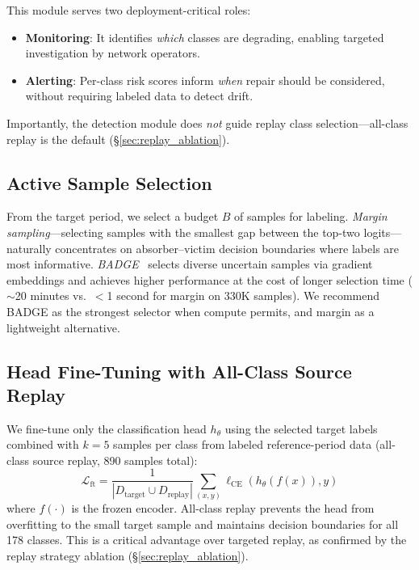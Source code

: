 \documentclass[journal]{IEEEtran}
\begin{document}
This module serves two deployment-critical roles:
\begin{itemize}
  \item \textbf{Monitoring}: It identifies \textit{which} classes are degrading, enabling targeted investigation by network operators.
  \item \textbf{Alerting}: Per-class risk scores inform \textit{when} repair should be considered, without requiring labeled data to detect drift.
\end{itemize}
Importantly, the detection module does \textit{not} guide replay class selection---all-class replay is the default (\S\ref{sec:replay_ablation}).

\subsection{Active Sample Selection}
\label{sec:sample_select}

From the target period, we select a budget $B$ of samples for labeling.
\textit{Margin sampling}---selecting samples with the smallest gap between the top-two logits---naturally concentrates on absorber--victim decision boundaries where labels are most informative.
\textit{BADGE}~\cite{ash2020badge} selects diverse uncertain samples via gradient embeddings and achieves higher performance at the cost of longer selection time (${\sim}$20 minutes vs.\ $<$1 second for margin on 330K samples).
We recommend BADGE as the strongest selector when compute permits, and margin as a lightweight alternative.

\subsection{Head Fine-Tuning with All-Class Source Replay}
\label{sec:ft_replay}

We fine-tune only the classification head $h_\theta$ using the selected target labels combined with $k{=}5$ samples per class from labeled reference-period data (all-class source replay, 890 samples total):
\begin{equation}
  \mathcal{L}_{\text{ft}} = \frac{1}{|D_{\text{target}} \cup D_{\text{replay}}|} \sum_{(x,y)} \ell_{\text{CE}}(h_\theta(f(x)), y)
\end{equation}
where $f(\cdot)$ is the frozen encoder.
All-class replay prevents the head from overfitting to the small target sample and maintains decision boundaries for all 178 classes. This is a critical advantage over targeted replay, as confirmed by the replay strategy ablation (\S\ref{sec:replay_ablation}).
\end{document}
